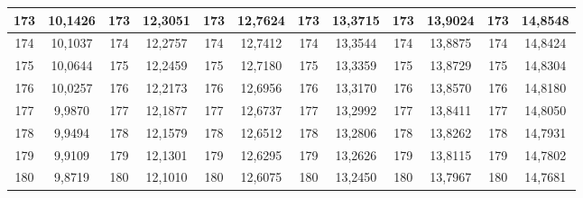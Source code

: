 \documentclass[a4paper,12pt]{article} %
\begin{document}
\begin{longtable}[c]{cccccccccc|c|c|}
	\multicolumn{1}{|c|}{173} & \multicolumn{1}{c|}{10,1426} & \multicolumn{1}{c|}{173} & \multicolumn{1}{c|}{12,3051} & \multicolumn{1}{c|}{173} & \multicolumn{1}{c|}{12,7624} & \multicolumn{1}{c|}{173} & \multicolumn{1}{c|}{13,3715} & \multicolumn{1}{c|}{173} & 13,9024 & 173 & 14,8548 \\ \hline
	\multicolumn{1}{|c|}{174} & \multicolumn{1}{c|}{10,1037} & \multicolumn{1}{c|}{174} & \multicolumn{1}{c|}{12,2757} & \multicolumn{1}{c|}{174} & \multicolumn{1}{c|}{12,7412} & \multicolumn{1}{c|}{174} & \multicolumn{1}{c|}{13,3544} & \multicolumn{1}{c|}{174} & 13,8875 & 174 & 14,8424 \\ \hline
	\multicolumn{1}{|c|}{175} & \multicolumn{1}{c|}{10,0644} & \multicolumn{1}{c|}{175} & \multicolumn{1}{c|}{12,2459} & \multicolumn{1}{c|}{175} & \multicolumn{1}{c|}{12,7180} & \multicolumn{1}{c|}{175} & \multicolumn{1}{c|}{13,3359} & \multicolumn{1}{c|}{175} & 13,8729 & 175 & 14,8304 \\ \hline
	\multicolumn{1}{|c|}{176} & \multicolumn{1}{c|}{10,0257} & \multicolumn{1}{c|}{176} & \multicolumn{1}{c|}{12,2173} & \multicolumn{1}{c|}{176} & \multicolumn{1}{c|}{12,6956} & \multicolumn{1}{c|}{176} & \multicolumn{1}{c|}{13,3170} & \multicolumn{1}{c|}{176} & 13,8570 & 176 & 14,8180 \\ \hline
	\multicolumn{1}{|c|}{177} & \multicolumn{1}{c|}{9,9870} & \multicolumn{1}{c|}{177} & \multicolumn{1}{c|}{12,1877} & \multicolumn{1}{c|}{177} & \multicolumn{1}{c|}{12,6737} & \multicolumn{1}{c|}{177} & \multicolumn{1}{c|}{13,2992} & \multicolumn{1}{c|}{177} & 13,8411 & 177 & 14,8050 \\ \hline
	\multicolumn{1}{|c|}{178} & \multicolumn{1}{c|}{9,9494} & \multicolumn{1}{c|}{178} & \multicolumn{1}{c|}{12,1579} & \multicolumn{1}{c|}{178} & \multicolumn{1}{c|}{12,6512} & \multicolumn{1}{c|}{178} & \multicolumn{1}{c|}{13,2806} & \multicolumn{1}{c|}{178} & 13,8262 & 178 & 14,7931 \\ \hline
	\multicolumn{1}{|c|}{179} & \multicolumn{1}{c|}{9,9109} & \multicolumn{1}{c|}{179} & \multicolumn{1}{c|}{12,1301} & \multicolumn{1}{c|}{179} & \multicolumn{1}{c|}{12,6295} & \multicolumn{1}{c|}{179} & \multicolumn{1}{c|}{13,2626} & \multicolumn{1}{c|}{179} & 13,8115 & 179 & 14,7802 \\ \hline
	\multicolumn{1}{|c|}{180} & \multicolumn{1}{c|}{9,8719} & \multicolumn{1}{c|}{180} & \multicolumn{1}{c|}{12,1010} & \multicolumn{1}{c|}{180} & \multicolumn{1}{c|}{12,6075} & \multicolumn{1}{c|}{180} & \multicolumn{1}{c|}{13,2450} & \multicolumn{1}{c|}{180} & 13,7967 & 180 & 14,7681 \\ \hline

\end{longtable}
\end{document}
